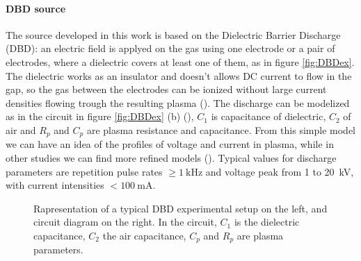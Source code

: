 \paragraph{DBD source}
The source developed in this work is based on the Dielectric Barrier Discharge (DBD): an electric field is applyed on the gas using one electrode or a pair of electrodes, where a dielectric covers at least one of them, as in figure \ref{fig:DBDex}.
The dielectric works as an insulator and doesn't allows DC current to flow in the gap, so the gas between the electrodes can be ionized without large current densities flowing trough the resulting plasma (\cite{Kogelschatz2003}). The discharge can be modelized as in the circuit in figure \ref{fig:DBDex} (b) (\cite{DBDcircuit}), $C_1$ is capacitance of dielectric, $C_2$ of air and $R_p$ and $C_p$ are plasma resistance and capacitance. From this simple model we can have an idea of the profiles of voltage and current in plasma, while in other studies we can find more refined models (\cite{doi:10.1063/1.4986023}). Typical values for discharge parameters are repetition pulse rates $\ge \SI{1}{\kilo\hertz}$ and voltage peak from \num{1} to \SI{20}{\kilo\volt}, with current intensities $<\SI{100}{\milli\ampere}$.
\begin{figure}
 \centering
 \hfill
 \caption{Rapresentation of a typical DBD experimental setup on the left, and circuit diagram on the right. In the circuit, $C_1$ is the dielectric capacitance, $C_2$ the air capacitance, $C_p$ and $R_p$ are plasma parameters.}
\end{figure}

